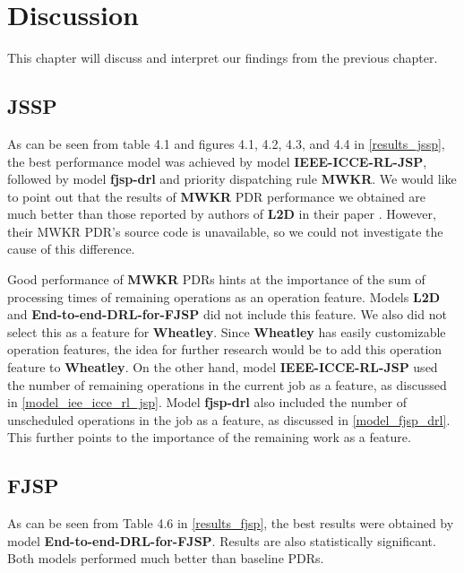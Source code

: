 \chapter{Discussion}

This chapter will discuss and interpret our findings from the previous chapter.

\section{JSSP}
As can be seen from table 4.1 and figures 4.1, 4.2, 4.3, and 4.4 in \ref{results_jssp}, the best performance model was achieved by model \textbf{IEEE-ICCE-RL-JSP}, followed by model \textbf{fjsp-drl} and priority dispatching rule \textbf{MWKR}. We would like to point out that the results of \textbf{MWKR} PDR performance we obtained are much better than those reported by authors of \textbf{L2D} in their paper \cite{zhang2020learning}. However, their MWKR PDR's source code is unavailable, so we could not investigate the cause of this difference.
\par
Good performance of \textbf{MWKR} PDRs hints at the importance of the sum of processing times of remaining operations as an operation feature. Models \textbf{L2D} and \textbf{End-to-end-DRL-for-FJSP} did not include this feature. We also did not select this as a feature for \textbf{Wheatley}. Since \textbf{Wheatley} has easily customizable operation features, the idea for further research would be to add this operation feature to \textbf{Wheatley}. On the other hand, model \textbf{IEEE-ICCE-RL-JSP} used the number of remaining operations in the current job as a feature, as discussed in \ref{model_iee_icce_rl_jsp}. Model \textbf{fjsp-drl} also included the number of unscheduled operations in the job as a feature, as discussed in \ref{model_fjsp_drl}. This further points to the importance of the remaining work as a feature. 

\section{FJSP}
As can be seen from Table 4.6 in \ref{results_fjsp}, the best results were obtained by model \textbf{End-to-end-DRL-for-FJSP}. Results are also statistically significant. Both models performed much better than baseline PDRs.

